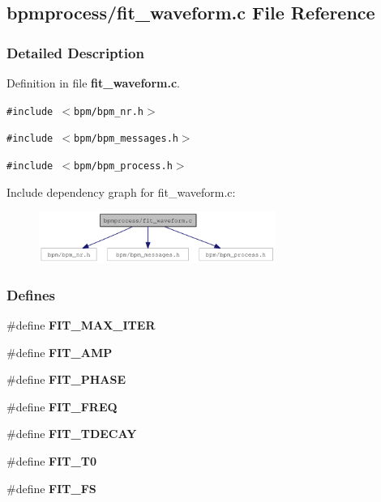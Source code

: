 \subsection{bpmprocess/fit\_\-waveform.c File Reference}
\label{fit__waveform_8c}


\subsubsection{Detailed Description}


Definition in file {\bf fit\_\-waveform.c}.

{\tt \#include $<$bpm/bpm\_\-nr.h$>$}\par
{\tt \#include $<$bpm/bpm\_\-messages.h$>$}\par
{\tt \#include $<$bpm/bpm\_\-process.h$>$}\par


Include dependency graph for fit\_\-waveform.c:\nopagebreak
\begin{figure}[H]
\begin{center}
\leavevmode
\includegraphics[width=218pt]{fit__waveform_8c__incl}
\end{center}
\end{figure}
\subsubsection*{Defines}
\begin{CompactItemize}
\item 
\#define \textbf{FIT\_\-MAX\_\-ITER}\label{fit__waveform_8c_2181690e4757168cb4ff93594aa86a51}

\item 
\#define \textbf{FIT\_\-AMP}\label{fit__waveform_8c_fb9a54016924b8d66a5e6f62090b2cfd}

\item 
\#define \textbf{FIT\_\-PHASE}\label{fit__waveform_8c_37773b2de4b59789d1f8a6d5bc52a1a8}

\item 
\#define \textbf{FIT\_\-FREQ}\label{fit__waveform_8c_afc1a762c8d7caf2a7296f75a076b4aa}

\item 
\#define \textbf{FIT\_\-TDECAY}\label{fit__waveform_8c_d77baf72df43c5755596e099afffcc9b}

\item 
\#define \textbf{FIT\_\-T0}\label{fit__waveform_8c_59928f7c9393805abd568243d1b98cb3}

\item 
\#define \textbf{FIT\_\-FS}\label{fit__waveform_8c_73038af3330937aebf64b4e958a11772}

\end{CompactItemize}

